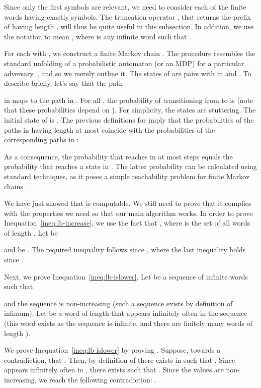 \documentclass[final,3p,times,twocolumn]{elsarticle}
\theoremstyle{plain}
\theoremstyle{definition}
\newcommand{\recallInequation}[1]{Inequation~\ref{#1}}
\begin{document}
Since only the first  symbols are relevant, we need to consider each of
the finite words  having exactly  symbols. The truncation
operator , that returns the prefix of 
having length , will thus be quite useful in this subsection.
In addition, we use the notation  to mean
, where  is any infinite word such
that .

For each  with , we construct a finite Markov
chain . The procedure resembles the standard unfolding of a
probabilistic automaton (or an MDP) for a particular
adversary~\cite{thesis:segala}, and so we merely outline it. The states of
 are pairs  with  in 
and . To describe  briefly, let's say that
the path

in  maps to the path
 in .
For all , the probability of transitioning
from  to  is 
(note that these probabilities depend on ). For simplicity, the states
 are stuttering. The initial state of  is
. The previous definitions for  imply that the
probabilities of the paths in  having length at most  coincide
with the probabilities of the corresponding paths in :

As a consequence, the probability that  reaches  in
at most  steps equals the probability that  reaches a state in
. The latter probability can be
calculated using standard techniques, as it poses a simple reachability
problem for finite Markov chains.

We have just showed that  is computable. We still need to prove
that it complies with the properties we need so that our main algorithm works.
In order to prove \recallInequation{ineq:lb-increase}, we use the fact
that ,
where  is the set of all words of length . Let  be

and  be . The required inequality
 follows since
,
where the last inequality holds since
.


Next, we prove \recallInequation{ineq:lb-islower}. Let
 be a sequence of
infinite words such that

and the sequence 
is non-increasing (such a sequence exists by definition of infimum). Let
 be a word of length  that appears infinitely often in the
sequence  (this word
exists as the sequence is infinite, and there are finitely many words of
length ).

We prove \recallInequation{ineq:lb-islower} by proving
. Suppose, towards a
contradiction, that . Then,
by definition of  there exists  in  such that
.
Since  appears infinitely often in
, there exists
 such that . Since
the values  are non-increasing, we reach the following
contradiction:
.
\end{document}
